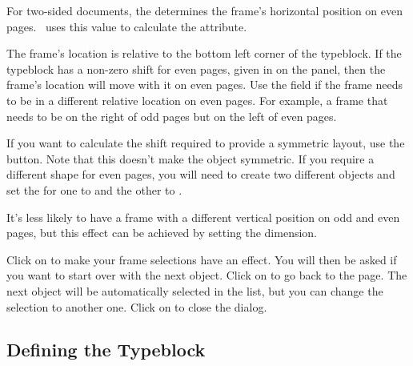 
For two-sided documents, the 
determines the frame's horizontal position on even pages.
\FlowframTk\ uses this value to calculate the  attribute.

\begin{information}
The frame's location is relative to the bottom left corner of the
\gls{typeblock}. If the \gls{typeblock} has a non-zero
shift for even pages, given in 
on the  panel, then the frame's location
will move with it on even pages. Use the  
 field if the frame needs
to be in a different relative location on even pages.
For example, a frame that needs to be on the right of odd pages but
on the left of even pages.
\end{information}


If you want to calculate the shift required to provide a symmetric
layout, use the 
button. Note that this doesn't make the object symmetric.
If you require a different shape for even pages, you will need to
create two different objects and set the 
 for one to 
 and the other to 
.

It's less likely to have a frame with a different vertical position
on odd and even pages, but this effect can be achieved by setting
the  dimension.

Click on  to make your frame selections have an
effect. You will then be asked if you want to start over
with the next \gls{object}.  Click on  to go back to the
 page.  The next \gls{object} will be
automatically selected in the  list, 
but you can change the selection to another
one. Click on  to close the  dialog.

\subsection{Defining the Typeblock}\label{sec:typeblock}

